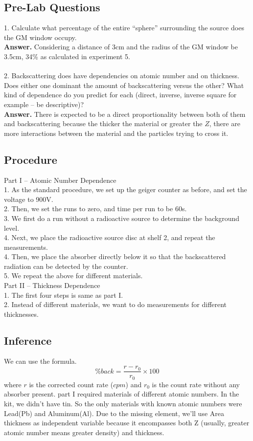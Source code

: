 \documentclass[twocolumn]{article}
\begin{document}
\subsection*{Pre-Lab Questions}
1. Calculate what percentage of the entire “sphere” surrounding the source does the GM window occupy.\\
\textbf{Answer.} Considering a distance of 3cm and the radius of the GM window be 3.5cm, 34\% as calculated in experiment 5.\\
\\
2. Backscattering does have dependencies on atomic number and on thickness. Does either one dominant the amount of backscattering versus the other? What kind of dependence do you predict for each (direct, inverse, inverse square for example – be descriptive)?\\
\textbf{Answer.} There is expected to be a direct proportionality between both of them and backscattering because the thicker the material or greater the $Z$, there are more interactions between the material and the particles trying to cross it.\\
\subsection*{Procedure}
Part I – Atomic Number Dependence\\
1. As the standard procedure, we set up the geiger counter as before, and set the voltage to 900V.\\
2. Then, we set the runs to zero, and time per run to be 60s.\\
3. We first do a run without a radioactive source to determine the background level.\\ 
4. Next, we place the radioactive source disc at shelf 2, and repeat the measurements.\\
4. Then, we place the absorber directly below it so that the backscattered radiation can be detected by the counter.\\
5. We repeat the above for different materials.\\
Part II – Thickness Dependence\\
1. The first four steps is same as part I.\\
2. Instead of different materials, we want to do measurements for different thicknesses.\\
\subsection*{Inference}
We can use the formula.
\begin{equation*}
\% back=\frac{r-r_0}{r_0}\times 100
\end{equation*}
where  $r $ is the corrected count rate ($cpm$)
and $r_0$ is the count rate without any absorber present.
part I required materials of different atomic numbers. In the kit, we didn't have tin. So the only materials with known atomic numbers were Lead(Pb) and Aluminum(Al). Due to the missing element, we'll use Area thickness as independent variable because it encompasses both Z (usually, greater atomic number means greater density) and thickness.
\end{document}
